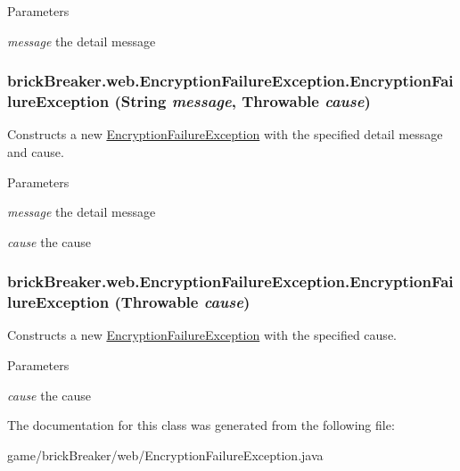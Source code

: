 \begin{DoxyParams}{Parameters}
\item[{\em message}]the detail message \end{DoxyParams}
\hypertarget{classbrick_breaker_1_1web_1_1_encryption_failure_exception_ac5820d6e36448bfa6286d3fd4466bcaa}{
\subsubsection[{EncryptionFailureException}]{\setlength{\rightskip}{0pt plus 5cm}brickBreaker.web.EncryptionFailureException.EncryptionFailureException (String {\em message}, \/  Throwable {\em cause})}}
\label{classbrick_breaker_1_1web_1_1_encryption_failure_exception_ac5820d6e36448bfa6286d3fd4466bcaa}
Constructs a new {\ttfamily \hyperlink{classbrick_breaker_1_1web_1_1_encryption_failure_exception}{EncryptionFailureException}} with the specified detail message and cause.


\begin{DoxyParams}{Parameters}
\item[{\em message}]the detail message \item[{\em cause}]the cause \end{DoxyParams}
\hypertarget{classbrick_breaker_1_1web_1_1_encryption_failure_exception_a0786930d051f36cb85a6d3d704b6cdfb}{
\subsubsection[{EncryptionFailureException}]{\setlength{\rightskip}{0pt plus 5cm}brickBreaker.web.EncryptionFailureException.EncryptionFailureException (Throwable {\em cause})}}
\label{classbrick_breaker_1_1web_1_1_encryption_failure_exception_a0786930d051f36cb85a6d3d704b6cdfb}
Constructs a new {\ttfamily \hyperlink{classbrick_breaker_1_1web_1_1_encryption_failure_exception}{EncryptionFailureException}} with the specified cause.


\begin{DoxyParams}{Parameters}
\item[{\em cause}]the cause \end{DoxyParams}


The documentation for this class was generated from the following file:\begin{DoxyCompactItemize}
\item 
game/brickBreaker/web/EncryptionFailureException.java\end{DoxyCompactItemize}

